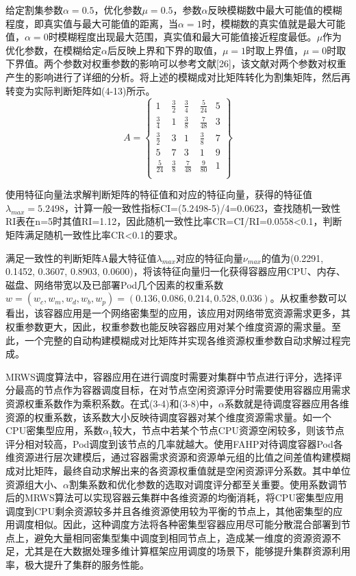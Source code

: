 给定割集参数$\alpha=0.5$，优化参数$\mu=0.5$，参数$\alpha$反映模糊数中最大可能值的模糊程度，即真实值与最大可能值的距离，当$\alpha=1$时，模糊数的真实值就是最大可能值，$\alpha=0$时模糊程度出现最大范围，真实值和最大可能值接近程度最低。$\mu$作为优化参数，在模糊给定$\alpha$后反映上界和下界的取值，$\mu=1$时取上界值，$\mu=0$时取下界值。两个参数对权重参数的影响可以参考文献[26]，该文献对两个参数对权重产生的影响进行了详细的分析。将上述的模糊成对比矩阵转化为割集矩阵，然后再转变为实际判断矩阵如(4-13)所示。
\begin{equation}
A = \left\{\begin{array}{ccccc}
1 & \frac{3}{2} & \frac{3}{4} & \frac{5}{24} & 5 \\
\frac{3}{4} & 1 & \frac{3}{8} & \frac{7}{48} & 3 \\
\frac{3}{2} & 3 & 1 & \frac{3}{8} & 7 \\
5 & 7 & 3 & 1 & 9 \\
\frac{5}{24} & \frac{3}{8} & \frac{7}{48} & \frac{9}{80} & 1 \\
\end{array}\right\}
\end{equation}

使用特征向量法求解判断矩阵的特征值和对应的特征向量，获得的特征值$\lambda_{max}=5.2498$，计算一般一致性指标CI=(5.2498-5)/4=0.0623，查找随机一致性RI表在n=5时其值RI=1.12，因此随机一致性比率CR=CI/RI=0.0558<0.1，判断矩阵满足随机一致性比率CR<0.1的要求。

满足一致性的判断矩阵A最大特征值$\lambda_{max}$对应的特征向量$\nu_{max}$的值为(0.2291, 0.1452, 0.3607, 0.8903, 0.0600)，将该特征向量归一化获得容器应用CPU、内存、磁盘、网络带宽以及已部署Pod几个因素的权重系数$w=(w_{c}, w_{m}, w_{d}, w_{b}, w_{p})=(0.136, 0.086, 0.214, 0.528, 0.036)$。从权重参数可以看出，该容器应用是一个网络密集型的应用，该应用对网络带宽资源需求更多，其权重参数更大，因此，权重参数也能反映容器应用对某个维度资源的需求量。至此，一个完整的自动构建模糊成对比矩阵并实现各维资源权重参数自动求解过程完成。

MRWS调度算法中，容器应用在进行调度时需要对集群中节点进行评分，选择评分最高的节点作为容器调度目标，在对节点空闲资源评分时需要使用容器应用需求资源权重系数作为乘积系数。在式(3-4)和(3-8)中，$\alpha$系数就是待调度容器应用各维资源的权重系数，该系数大小反映待调度容器对某个维度资源需求量。如一个CPU密集型应用，系数$\alpha_{1}$较大，节点中若某个节点CPU资源空闲较多，则该节点评分相对较高，Pod调度到该节点的几率就越大。使用FAHP对待调度容器Pod各维资源进行层次建模后，通过容器需求资源和资源单元组的比值之间差值构建模糊成对比矩阵，最终自动求解出来的各资源权重值就是空闲资源评分系数。其中单位资源组大小、$\alpha$割集系数和优化参数的选取对调度评分都至关重要。使用系数调节后的MRWS算法可以实现容器云集群中各维资源的均衡消耗，将CPU密集型应用调度到CPU剩余资源较多并且各维资源使用较为平衡的节点上，其他密集型的应用调度相似。因此，这种调度方法将各种密集型容器应用尽可能分散混合部署到节点上，避免大量相同密集型集中调度到相同节点上，造成某一维度的资源资源不足，尤其是在大数据处理多维计算框架应用调度的场景下，能够提升集群资源利用率，极大提升了集群的服务性能。

